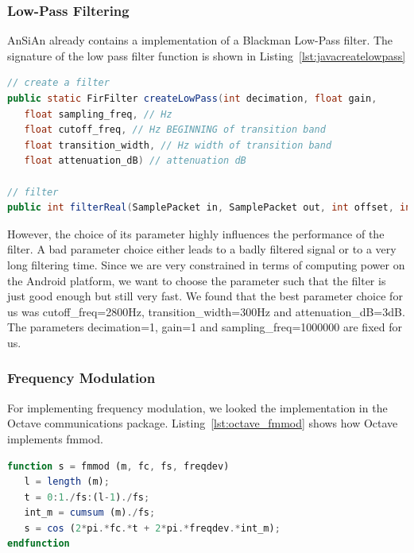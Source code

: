 \subsubsection{Low-Pass Filtering}

AnSiAn already contains a implementation of a Blackman Low-Pass filter. The signature of the low pass filter function is shown in Listing~\ref{lst:javacreatelowpass}

\begin{lstlisting}[label=lst:javacreatelowpass, caption=AnSiAn Blackman Low-Pass Filter, language=java]
// create a filter 
public static FirFilter createLowPass(int decimation, float gain, 
   float sampling_freq, // Hz
   float cutoff_freq, // Hz BEGINNING of transition band
   float transition_width, // Hz width of transition band
   float attenuation_dB) // attenuation dB
   
// filter 
public int filterReal(SamplePacket in, SamplePacket out, int offset, int length)    

\end{lstlisting}
However, the choice of its parameter highly influences the performance of the filter. A bad parameter choice either leads to a badly filtered signal or to a very long filtering time. Since we are very constrained in terms of computing power on the Android platform, we want to choose the parameter such that the filter is just good enough but still very fast. 
We found that the best parameter choice for us was cutoff\_freq=2800Hz, transition\_width=300Hz and attenuation\_dB=3dB. \\
The parameters decimation=1, gain=1 and sampling\_freq=1000000 are fixed for us. 

\subsubsection{Frequency Modulation}

For implementing frequency modulation, we looked the implementation in the Octave communications package. Listing~\ref{lst:octave_fmmod} shows how Octave implements fmmod. 
\lstset{numbers=left}
\lstset{stepnumber=1}
\begin{lstlisting}[label=lst:octave_fmmod, caption=Octave implementation of Frequency modulation \cite{octavefmmod}, language=octave,]
function s = fmmod (m, fc, fs, freqdev)
   l = length (m);
   t = 0:1./fs:(l-1)./fs;
   int_m = cumsum (m)./fs;
   s = cos (2*pi.*fc.*t + 2*pi.*freqdev.*int_m);
endfunction
\end{lstlisting}

